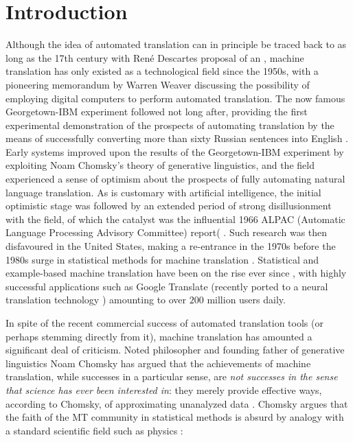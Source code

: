 \documentclass[jair,twoside,11pt,theapa]{article}
\begin{document}
\section{Introduction}

Although the idea of automated translation can in principle be traced back to as long as the 17th century with Ren\'{e} Descartes proposal of an  \cite{dascal1982universal}, machine translation has only existed as a technological field since the 1950s, with a pioneering memorandum by  Warren Weaver \cite{locke1955machine,weaver1955translation} discussing the possibility of employing digital computers to perform automated translation. The now famous Georgetown-IBM experiment followed not long after, providing the first experimental demonstration of the prospects of automating translation by the means of successfully converting more than sixty Russian sentences into English \cite{gordin2015scientific}. Early systems improved upon the results of the Georgetown-IBM experiment by exploiting Noam Chomsky's theory of generative linguistics, and the field experienced a sense of optimism about the prospects of fully automating natural language translation. As is customary with artificial intelligence, the initial optimistic stage was followed by an extended period of strong disillusionment with the field, of which the catalyst was the influential 1966 ALPAC (Automatic Language Processing Advisory Committee) report( \cite{hutchins1986machine}. 
Such research was then disfavoured in the United States, making a re-entrance in the 1970s before the 1980s surge in statistical methods for machine translation \cite{koehn2009statistical,Moses2007}. Statistical and example-based machine translation have been on the rise ever since \cite{Bahdanau2014,carl2003recent,Firat2017}, with highly successful applications such as Google Translate (recently ported to a neural translation technology \cite{wu2016google}) amounting to over $200$ million users daily.

In spite of the recent commercial success of automated translation tools (or perhaps stemming directly from it), machine translation has amounted a significant deal of criticism. Noted philosopher and founding father of generative linguistics Noam Chomsky has argued that the achievements of machine translation, while successes in a particular sense, are \emph{not successes in the sense that science has ever been interested in}: they merely provide effective ways, according to Chomsky, of approximating unanalyzed data \cite{Chomsky2011,norvig2017chomsky}. Chomsky argues that the faith of the MT community in statistical methods is absurd by analogy with a standard scientific field such as physics \cite{Chomsky2011}:
\end{document}
